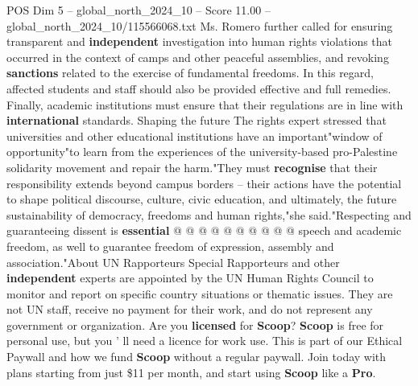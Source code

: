 \begin{textsample}{POS Dim 5 – global\_north\_2024\_10 – Score 11.00 – global\_north\_2024\_10/115566068.txt}
Ms.
Romero further called for ensuring transparent and \textbf{independent} investigation into human rights violations that occurred in the context of camps and other peaceful assemblies, and revoking \textbf{sanctions} related to the exercise of fundamental freedoms.
In this regard, affected students and staff should also be provided effective and full remedies.
Finally, academic institutions must ensure that their regulations are in line with \textbf{international} standards.
Shaping the future The rights expert stressed that universities and other educational institutions have an important"window of opportunity"to learn from the experiences of the university-based pro-Palestine solidarity movement and repair the harm."They must \textbf{recognise} that their responsibility extends beyond campus borders -- their actions have the potential to shape political discourse, culture, civic education, and ultimately, the future sustainability of democracy, freedoms and human rights,"she said."Respecting and guaranteeing dissent is \textbf{essential} @ @ @ @ @ @ @ @ @ @ speech and academic freedom, as well to guarantee freedom of expression, assembly and association."About UN Rapporteurs Special Rapporteurs and other \textbf{independent} experts are appointed by the UN Human Rights Council to monitor and report on specific country situations or thematic issues.
They are not UN staff, receive no payment for their work, and do not represent any government or organization.
Are you \textbf{licensed} for \textbf{Scoop}? \textbf{Scoop} is free for personal use, but you ' ll need a licence for work use.
This is part of our Ethical Paywall and how we fund \textbf{Scoop} without a regular paywall.
Join today with plans starting from just \$11 per month, and start using \textbf{Scoop} like a \textbf{Pro}.

\end{textsample}
